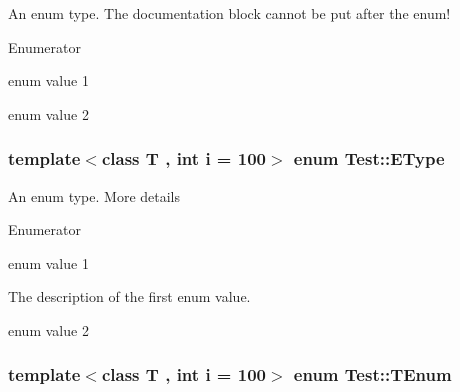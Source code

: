 An enum type. The documentation block cannot be put after the enum! \begin{Desc}
\item[Enumerator]\par
\begin{description}
\item[{\em 
\hypertarget{classTest_a26bf93efdaea3c6e2cfa4119c3755d3fac5f5895ba2af9a9fa16f6840a45d659c}{E\-Val1}\label{classTest_a26bf93efdaea3c6e2cfa4119c3755d3fac5f5895ba2af9a9fa16f6840a45d659c}
}]enum value 1 \item[{\em 
\hypertarget{classTest_a26bf93efdaea3c6e2cfa4119c3755d3fa565724e73b1352aaa0af531d8018167e}{E\-Val2}\label{classTest_a26bf93efdaea3c6e2cfa4119c3755d3fa565724e73b1352aaa0af531d8018167e}
}]enum value 2 \end{description}
\end{Desc}
\hypertarget{classTest_a0653c5125502203305b6fe839e99ed01}{
\subsubsection[{E\-Type}]{\setlength{\rightskip}{0pt plus 5cm}template$<$class T , int i = 100$>$ enum {\bf Test\-::\-E\-Type}}}\label{classTest_a0653c5125502203305b6fe839e99ed01}
An enum type. More details \begin{Desc}
\item[Enumerator]\par
\begin{description}
\item[{\em 
\hypertarget{classTest_ad8d13fe56b896633273087859b89a1a3af621232782128e49458adf9069e126d4}{Val1}\label{classTest_ad8d13fe56b896633273087859b89a1a3af621232782128e49458adf9069e126d4}
}]enum value 1

The description of the first enum value. \item[{\em 
\hypertarget{classTest_ad8d13fe56b896633273087859b89a1a3a218603a97012ef8dce0b798d598b2866}{Val2}\label{classTest_ad8d13fe56b896633273087859b89a1a3a218603a97012ef8dce0b798d598b2866}
}]enum value 2 \end{description}
\end{Desc}
\hypertarget{classTest_ad8d13fe56b896633273087859b89a1a3}{
\subsubsection[{T\-Enum}]{\setlength{\rightskip}{0pt plus 5cm}template$<$class T , int i = 100$>$ enum {\bf Test\-::\-T\-Enum}}}\label{classTest_ad8d13fe56b896633273087859b89a1a3}
